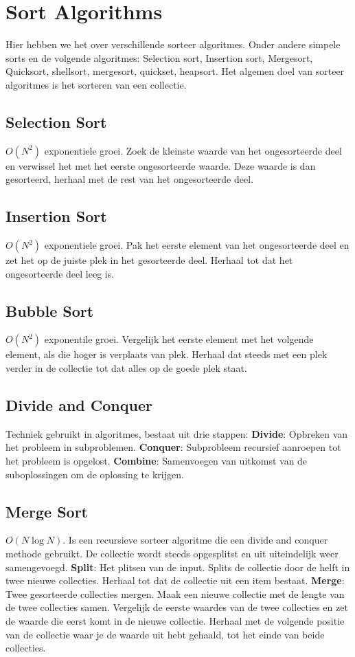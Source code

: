 \section{Sort Algorithms}
Hier hebben we het over verschillende sorteer algoritmes.
Onder andere simpele sorts en de volgende algoritmes: Selection sort, Insertion sort, Mergesort, Quicksort, shellsort, mergesort, quickset, heapsort.
Het algemen doel van sorteer algoritmes is het sorteren van een collectie.

\subsection{Selection Sort}
$O(N^2)$ exponentiele groei.
Zoek de kleinste waarde van het ongesorteerde deel en verwissel het met het eerste ongesorteerde waarde.
Deze waarde is dan gesorteerd, herhaal met de rest van het ongesorteerde deel.

\subsection{Insertion Sort}
$O(N^2)$ exponentiele groei.
Pak het eerste element van het ongesorteerde deel en zet het op de juiste plek in het gesorteerde deel.
Herhaal tot dat het ongesorteerde deel leeg is.

\subsection{Bubble Sort}
$O(N^2)$ exponentile groei.
Vergelijk het eerste element met het volgende element, als die hoger is verplaats van plek.
Herhaal dat steeds met een plek verder in de collectie tot dat alles op de goede plek staat.

\subsection{Divide and Conquer}
Techniek gebruikt in algoritmes, bestaat uit drie stappen: 
\textbf{Divide}: Opbreken van het probleem in subproblemen.
\textbf{Conquer}: Subprobleem recursief aanroepen tot het probleem is opgelost.
\textbf{Combine}: Samenvoegen van uitkomst van de suboplossingen om de oplossing te krijgen.

\subsection{Merge Sort}
$O(N\log N)$.
Is een recursieve sorteer algoritme die een divide and conquer methode gebruikt.
De collectie wordt steeds opgesplitst en uit uiteindelijk weer samengevoegd.
\textbf{Split}: Het plitsen van de input.
Splits de collectie door de helft in twee nieuwe collecties.
Herhaal tot dat de collectie uit een item bestaat.
\textbf{Merge}: Twee gesorteerde collecties mergen.
Maak een nieuwe collectie met de lengte van de twee collecties samen.
Vergelijk de eerste waardes van de twee collecties en zet de waarde die eerst komt in de nieuwe collectie.
Herhaal met de volgende positie van de collectie waar je de waarde uit hebt gehaald, tot het einde van beide collecties.

